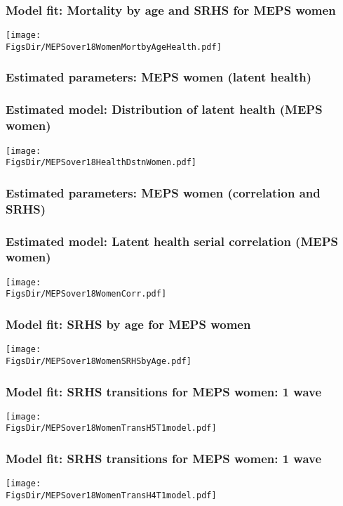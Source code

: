 \documentclass[aspectratio=169]{beamer}
\newcommand{\FigsDir}{../Figures}
\newcommand{\TabsDir}{../Tables}
\begin{document}
\begin{frame}\frametitle{Model fit: Mortality by age and SRHS for MEPS women}
\begin{center}
	\texttt{[image: \\FigsDir/MEPSover18WomenMortbyAgeHealth.pdf]}
\end{center}
\end{frame}


\begin{frame}\frametitle{Estimated parameters: MEPS women (latent health)}

\end{frame}


\begin{frame}\frametitle{Estimated model: Distribution of latent health (MEPS women)}
\begin{center}
	\texttt{[image: \\FigsDir/MEPSover18HealthDstnWomen.pdf]}
\end{center}
\end{frame}


\begin{frame}\frametitle{Estimated parameters: MEPS women (correlation and SRHS)}
\vspace{-0.25cm}

\end{frame}


\begin{frame}\frametitle{Estimated model: Latent health serial correlation (MEPS women)}
\begin{center}
	\texttt{[image: \\FigsDir/MEPSover18WomenCorr.pdf]}
\end{center}
\end{frame}


\begin{frame}\frametitle{Model fit: SRHS by age for MEPS women}
\begin{center}
	\texttt{[image: \\FigsDir/MEPSover18WomenSRHSbyAge.pdf]}
\end{center}
\end{frame}


\begin{frame}\frametitle{Model fit: SRHS transitions for MEPS women: 1 wave}
\begin{center}
	\texttt{[image: \\FigsDir/MEPSover18WomenTransH5T1model.pdf]}
\end{center}
\end{frame}

\begin{frame}\frametitle{Model fit: SRHS transitions for MEPS women: 1 wave}
\begin{center}
	\texttt{[image: \\FigsDir/MEPSover18WomenTransH4T1model.pdf]}
\end{center}
\end{frame}
\end{document}
